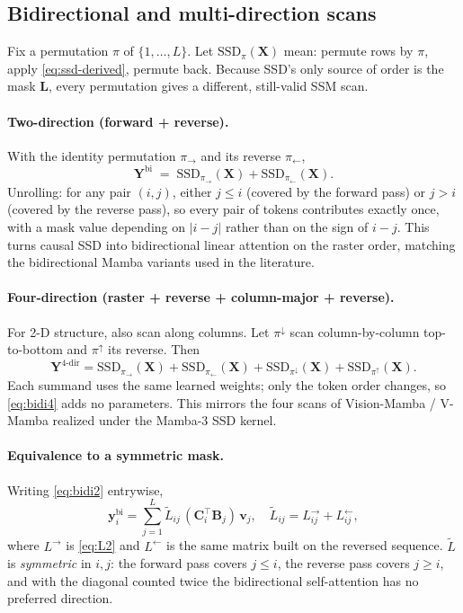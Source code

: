 \documentclass[11pt,a4paper]{article}
\begin{document}
\subsection{Bidirectional and multi-direction scans}
\label{sec:bidi}

Fix a permutation $\pi$ of $\{1,\dots,L\}$. Let
$\mathrm{SSD}_\pi(\bm{X})$ mean: permute rows by $\pi$, apply
\eqref{eq:ssd-derived}, permute back. Because SSD's only source of
order is the mask $\bm{L}$, every permutation gives a different,
still-valid SSM scan.

\paragraph{Two-direction (forward + reverse).} With the identity
permutation $\pi_\to$ and its reverse $\pi_\leftarrow$,
\begin{equation}\label{eq:bidi2}
  \bm{Y}^{\text{bi}}
   \;=\; \mathrm{SSD}_{\pi_\to}(\bm{X}) + \mathrm{SSD}_{\pi_\leftarrow}(\bm{X}).
\end{equation}
Unrolling: for any pair $(i,j)$, either $j\le i$ (covered by the
forward pass) or $j>i$ (covered by the reverse pass), so every pair
of tokens contributes exactly once, with a mask value depending on
$|i-j|$ rather than on the sign of $i-j$. This turns causal SSD into
bidirectional linear attention on the raster order, matching the
bidirectional Mamba variants used in the literature.

\paragraph{Four-direction (raster + reverse + column-major + reverse).}
For 2-D structure, also scan along columns. Let $\pi^\downarrow$ scan
column-by-column top-to-bottom and $\pi^\uparrow$ its reverse. Then
\begin{equation}\label{eq:bidi4}
  \bm{Y}^{\text{4-dir}}
   = \mathrm{SSD}_{\pi_\to}(\bm{X}) + \mathrm{SSD}_{\pi_\leftarrow}(\bm{X})
   + \mathrm{SSD}_{\pi^\downarrow}(\bm{X}) + \mathrm{SSD}_{\pi^\uparrow}(\bm{X}).
\end{equation}
Each summand uses the same learned weights; only the token order
changes, so \eqref{eq:bidi4} adds no parameters. This mirrors the
four scans of Vision-Mamba / V-Mamba realized under the Mamba-3 SSD
kernel.

\paragraph{Equivalence to a symmetric mask.} Writing
\eqref{eq:bidi2} entrywise,
\begin{equation}\label{eq:bidi-sym}
  \bm{y}_i^{\text{bi}} = \sum_{j=1}^{L} \widetilde{L}_{ij}\,
       (\bm{C}_i^\top\bm{B}_j)\,\bm{v}_j,
  \quad
  \widetilde{L}_{ij} = L_{ij}^{\to} + L_{ij}^{\leftarrow},
\end{equation}
where $L^\to$ is \eqref{eq:L2} and $L^\leftarrow$ is the same matrix
built on the reversed sequence. $\widetilde{L}$ is \emph{symmetric} in
$i,j$: the forward pass covers $j\le i$, the reverse pass covers
$j\ge i$, and with the diagonal counted twice the bidirectional
self-attention has no preferred direction.
\end{document}
